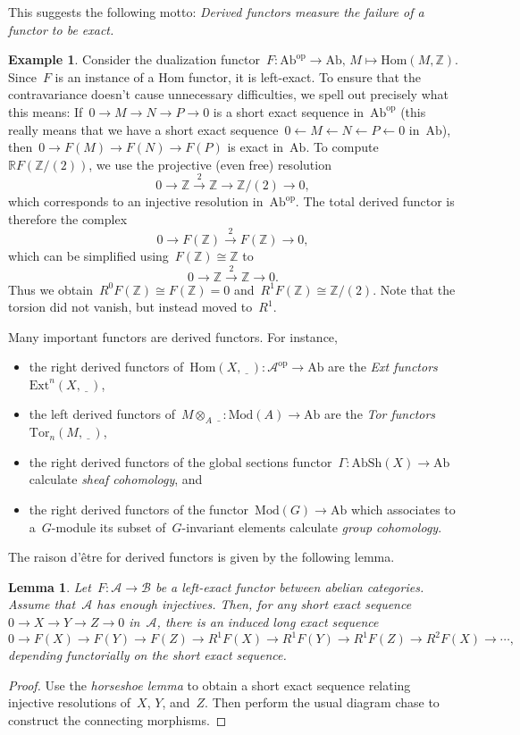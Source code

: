 \documentclass{amsart}
\theoremstyle{definition}
\newtheorem{ex}[defn]{Example}
\theoremstyle{plain}
\newtheorem{lemma}[defn]{Lemma}
\theoremstyle{remark}
\newcommand{\ZZ}{\mathbb{Z}}
\newcommand{\A}{\mathcal{A}}
\newcommand{\B}{\mathcal{B}}
\newcommand{\RR}{\mathbb{R}}
\newcommand{\Ext}{\mathrm{Ext}}
\newcommand{\Tor}{\mathrm{Tor}}
\newcommand{\Hom}{\mathrm{Hom}}
\newcommand{\placeholder}{\underline{\ \ \ }}
\newcommand{\Ab}{\mathrm{Ab}}
\newcommand{\AbSh}{\mathrm{AbSh}}
\newcommand{\Mod}{\mathrm{Mod}}
\newcommand{\op}{\mathrm{op}}
\newcommand{\?}{\,{:}\,}
\renewcommand{\_}{\mathpunct{.}\,}
\newcommand{\lra}{\longrightarrow}
\begin{document}
This suggests the following motto: \emph{Derived functors measure the
failure of a functor to be exact.}

\begin{ex}Consider the dualization functor~$F : \Ab^\op \to \Ab,\,M \mapsto
\Hom(M,\ZZ)$. Since~$F$ is an instance of a Hom functor, it is left-exact. To
ensure that the contravariance doesn't cause unnecessary difficulties, we spell
out precisely what this means: If~$0 \to M \to N \to P \to 0$ is a short exact
sequence in~$\Ab^\op$ (this really means that we have a short exact sequence~$0
\leftarrow M \leftarrow N \leftarrow P \leftarrow 0$ in~$\Ab$), then~$0 \to F(M) \to F(N) \to
F(P)$ is exact in~$\Ab$. To compute~$\RR F(\ZZ/(2))$, we use the projective
(even free) resolution
\[ 0 \lra \ZZ \stackrel{2}{\longrightarrow} \ZZ \lra \ZZ/(2) \lra 0, \]
which corresponds to an injective resolution in~$\Ab^\op$. The total derived
functor is therefore the complex
\[ 0 \lra F(\ZZ) \stackrel{2}{\longrightarrow} F(\ZZ) \lra 0, \]
which can be simplified using~$F(\ZZ) \cong \ZZ$ to
\[ 0 \lra \ZZ \stackrel{2}{\longrightarrow} \ZZ \lra 0. \]
Thus we obtain~$R^0 F(\ZZ) \cong F(\ZZ) = 0$ and~$R^1 F(\ZZ) \cong \ZZ/(2)$.
Note that the torsion did not vanish, but instead moved to~$R^1$.
\end{ex}

Many important functors are derived functors. For instance,
\begin{itemize}
\item the right derived functors of~$\Hom(X, \placeholder) : \A^\op \to
\Ab$ are the \emph{Ext functors} $\Ext^n(X, \placeholder)$,
\item the left derived functors of~$M \otimes_A \placeholder : \Mod(A) \to \Ab$
are the \emph{Tor functors} $\Tor_n(M, \placeholder)$,
\item the right derived functors of the global sections functor~$\Gamma :
\AbSh(X) \to \Ab$ calculate \emph{sheaf cohomology}, and
\item the right derived functors of the functor~$\Mod(G) \to \Ab$ which associates to
a~$G$-module its subset of~$G$-invariant elements calculate \emph{group
cohomology}.
\end{itemize}

The raison d'être for derived functors is given by the following lemma.

\begin{lemma}Let~$F : \A \to \B$ be a left-exact functor between abelian
categories. Assume that~$\A$ has enough injectives. Then, for any short exact
sequence~$0 \to X \to Y \to Z \to 0$ in~$\A$, there is an induced long exact
sequence
\[ 0 \to F(X) \to F(Y) \to F(Z) \to R^1 F(X) \to R^1 F(Y) \to R^1 F(Z) \to R^2
F(X) \to \cdots, \]
depending functorially on the short exact sequence.\end{lemma}
\begin{proof}Use the \emph{horseshoe lemma} to obtain a short exact sequence
relating injective resolutions of~$X$, $Y$, and~$Z$. Then perform the usual
diagram chase to construct the connecting morphisms.\end{proof}
\end{document}
